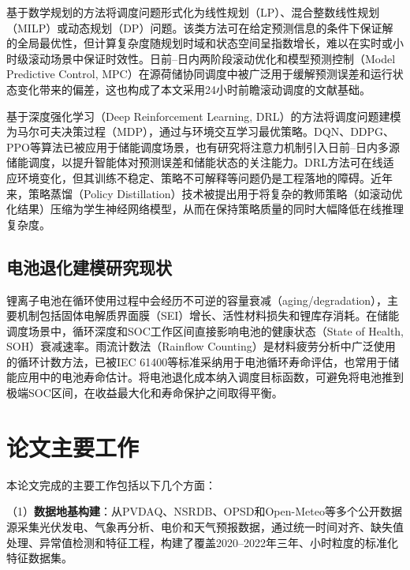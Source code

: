 \documentclass[12pt,a4paper]{ctexbook}
\begin{document}
基于数学规划的方法将调度问题形式化为线性规划（LP）、混合整数线性规划（MILP）或动态规划（DP）问题\cite{milp-dispatch-2021}。该类方法可在给定预测信息的条件下保证解的全局最优性，但计算复杂度随规划时域和状态空间呈指数增长，难以在实时或小时级滚动场景中保证时效性。日前--日内两阶段滚动优化和模型预测控制（Model Predictive Control, MPC）在源荷储协同调度中被广泛用于缓解预测误差和运行状态变化带来的偏差\cite{bo-two-stage-rolling-2025,li-mpc-microgrid-2025}，这也构成了本文采用24小时前瞻滚动调度的文献基础。

基于深度强化学习（Deep Reinforcement Learning, DRL）的方法将调度问题建模为马尔可夫决策过程（MDP），通过与环境交互学习最优策略\cite{drl-energy-storage-2023}。DQN、DDPG、PPO等算法已被应用于储能调度场景，也有研究将注意力机制引入日前--日内多源储能调度，以提升智能体对预测误差和储能状态的关注能力。DRL方法可在线适应环境变化，但其训练不稳定、策略不可解释等问题仍是工程落地的障碍。近年来，策略蒸馏（Policy Distillation）技术\cite{policy-distillation-2016}被提出用于将复杂的教师策略（如滚动优化结果）压缩为学生神经网络模型，从而在保持策略质量的同时大幅降低在线推理复杂度。

\subsection{电池退化建模研究现状}

锂离子电池在循环使用过程中会经历不可逆的容量衰减（aging/degradation），主要机制包括固体电解质界面膜（SEI）增长、活性材料损失和锂库存消耗\cite{battery-degradation-review-2021}。在储能调度场景中，循环深度和SOC工作区间直接影响电池的健康状态（State of Health, SOH）衰减速率。雨流计数法（Rainflow Counting）是材料疲劳分析中广泛使用的循环计数方法，已被IEC 61400等标准采纳用于电池循环寿命评估，也常用于储能应用中的电池寿命估计\cite{rainflow-soc-2022}。将电池退化成本纳入调度目标函数，可避免将电池推到极端SOC区间，在收益最大化和寿命保护之间取得平衡。

\section{论文主要工作}

本论文完成的主要工作包括以下几个方面：

（1）\textbf{数据地基构建}：从PVDAQ、NSRDB、OPSD和Open-Meteo等多个公开数据源采集光伏发电、气象再分析、电价和天气预报数据，通过统一时间对齐、缺失值处理、异常值检测和特征工程，构建了覆盖2020--2022年三年、小时粒度的标准化特征数据集。\cite{pvdaq-nrel,nsrdb-nrel,opsd-datapackage-2020,opsd-wiese-2019,open-meteo-2023}
\end{document}
